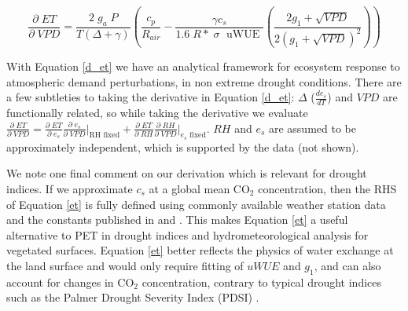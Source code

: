 \documentclass[draft,linenumbers]{gcbjournal}
\begin{document}
\begin{linenomath*}
  \begin{equation}
    \frac{\partial \;  ET}{\partial \; VPD} = \frac{2\; g_a \; P}{T(\Delta + \gamma)}   \left(\frac{ c_p}{R_{air}} -  \frac{\gamma c_s }{1.6 \; R*\; \sigma \; \text{ uWUE }} \left( \frac{2 g_1 + \sqrt{VPD}}{2 (g_1 + \sqrt{VPD})^2}\right) \right)
    \label{d_et}
  \end{equation}
\end{linenomath*}

With Equation \ref{d_et} we have an analytical framework for ecosystem response to atmospheric demand perturbations, in non extreme drought conditions. There are a few subtleties to taking the derivative in Equation \ref{d_et}: $\Delta$ ($\frac{d e_{s}}{d T}$) and $VPD$ are functionally related, so while taking the derivative we evaluate $\frac{\partial \; ET}{\partial \; VPD} = \frac{\partial \; ET} {\partial \; e_s} \frac{\partial \; e_s}{\partial \; VPD} \Big|_{\text{RH fixed}} + \frac{\partial \; ET}{\partial \; RH} \frac{\partial \; RH}{\partial \; VPD} \Big|_{\text{$e_s$ fixed}}$. $RH$ and $e_s$ are assumed to be approximately independent, which is supported by the data (not shown). 

We note one final comment on our derivation which is relevant for drought indices. If we approximate $c_s$ at a global mean CO$_2$ concentration, then the RHS of Equation \ref{et} is fully defined using commonly available weather station data and the constants published in \citet{Zhou_2015} and \citet{Lin_2015}. This makes Equation \ref{et} a useful alternative to PET in drought indices and hydrometeorological analysis for vegetated surfaces. Equation \ref{et} better reflects the physics of water exchange at the land surface and would only require fitting of $uWUE$ and $g_1$, and can also account for changes in CO$_2$ concentration, contrary to typical drought indices such as the Palmer Drought Severity Index (PDSI) \citep{Swann_2016}.
\end{document}
